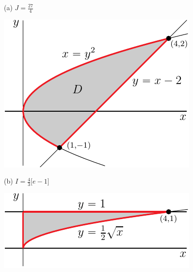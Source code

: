 \begin{answer}
(a) $J=\frac{27}{4}$

\begin{center}
     \includegraphics[scale=0.95]{fig/OE10D_5a.pdf}
\end{center}


(b) $I=\frac{4}{3}\big[e-1\big]$

\begin{center}
     \includegraphics[scale=0.95]{fig/OE10D_5b.pdf}
\end{center}
\end{answer}

